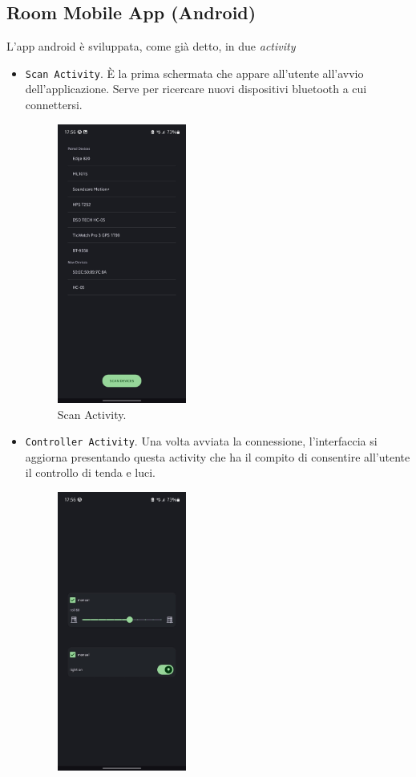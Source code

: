 \documentclass[a4paper,12pt]{report}
\begin{document}
\subsection{Room Mobile App (Android)}
L'app android è sviluppata, come già detto, in due \emph{activity}
\begin{itemize}
    \item \texttt{Scan Activity}. È la prima schermata che appare all'utente all'avvio dell'applicazione. Serve per ricercare nuovi dispositivi bluetooth a cui connettersi.
    \begin{figure}[H]
        \centering
        \includegraphics[width=0.4\textwidth]{img/Ui - scan.jpeg}
        \caption{Scan Activity.}
        \label{fig:scan}
    \end{figure}
    \item \texttt{Controller Activity}. Una volta avviata la connessione, l'interfaccia si aggiorna presentando questa activity che ha il compito di consentire all'utente il controllo di tenda e luci.
    \begin{figure}[H]
        \centering
        \includegraphics[width=0.4\textwidth]{img/Ui - controller.jpeg}

\end{figure}
\end{itemize}
\end{document}

